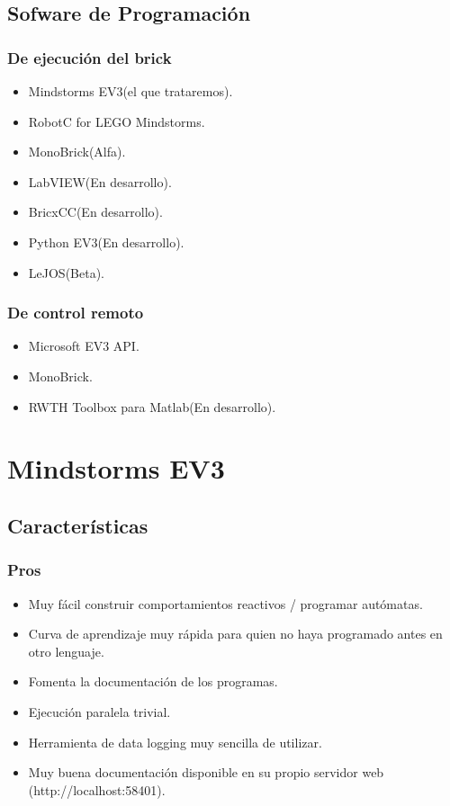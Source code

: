 \documentclass[12pt,a4paper]{article}
\begin{document}
\subsection{Sofware de Programación}

\subsubsection{De ejecución del brick}

\begin{itemize}
\item Mindstorms EV3(el que trataremos).
\item RobotC for LEGO Mindstorms.
\item MonoBrick(Alfa).
\item LabVIEW(En desarrollo).
\item BricxCC(En desarrollo).
\item Python EV3(En desarrollo).
\item LeJOS(Beta).
\end{itemize}

\subsubsection{De control remoto}

\begin{itemize}
\item Microsoft EV3 API.
\item MonoBrick.
\item RWTH Toolbox para Matlab(En desarrollo).
\end{itemize}

\clearpage 
\section{Mindstorms EV3}

\subsection{Características}

\subsubsection{Pros}

\begin{itemize}
\item Muy fácil construir comportamientos reactivos / programar autómatas.
\item Curva de aprendizaje muy rápida para quien no haya programado antes en
otro lenguaje.
\item Fomenta la documentación de los programas.
\item Ejecución paralela trivial.
\item Herramienta de data logging muy sencilla de utilizar.
\item Muy buena documentación disponible en su propio servidor web
(http://localhost:58401).
\end{itemize}
\end{document}
